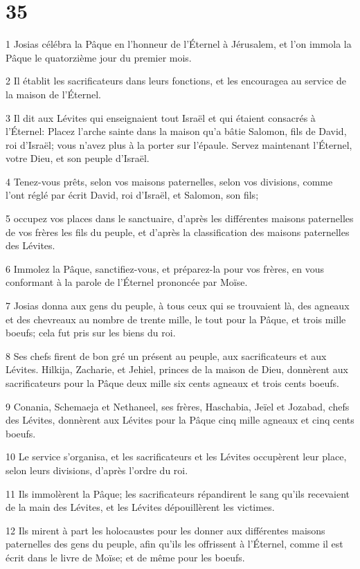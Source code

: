 \chapter{35}

\par 1 Josias célébra la Pâque en l'honneur de l'Éternel à Jérusalem, et l'on immola la Pâque le quatorzième jour du premier mois.
\par 2 Il établit les sacrificateurs dans leurs fonctions, et les encouragea au service de la maison de l'Éternel.
\par 3 Il dit aux Lévites qui enseignaient tout Israël et qui étaient consacrés à l'Éternel: Placez l'arche sainte dans la maison qu'a bâtie Salomon, fils de David, roi d'Israël; vous n'avez plus à la porter sur l'épaule. Servez maintenant l'Éternel, votre Dieu, et son peuple d'Israël.
\par 4 Tenez-vous prêts, selon vos maisons paternelles, selon vos divisions, comme l'ont réglé par écrit David, roi d'Israël, et Salomon, son fils;
\par 5 occupez vos places dans le sanctuaire, d'après les différentes maisons paternelles de vos frères les fils du peuple, et d'après la classification des maisons paternelles des Lévites.
\par 6 Immolez la Pâque, sanctifiez-vous, et préparez-la pour vos frères, en vous conformant à la parole de l'Éternel prononcée par Moïse.
\par 7 Josias donna aux gens du peuple, à tous ceux qui se trouvaient là, des agneaux et des chevreaux au nombre de trente mille, le tout pour la Pâque, et trois mille boeufs; cela fut pris sur les biens du roi.
\par 8 Ses chefs firent de bon gré un présent au peuple, aux sacrificateurs et aux Lévites. Hilkija, Zacharie, et Jehiel, princes de la maison de Dieu, donnèrent aux sacrificateurs pour la Pâque deux mille six cents agneaux et trois cents boeufs.
\par 9 Conania, Schemaeja et Nethaneel, ses frères, Haschabia, Jeïel et Jozabad, chefs des Lévites, donnèrent aux Lévites pour la Pâque cinq mille agneaux et cinq cents boeufs.
\par 10 Le service s'organisa, et les sacrificateurs et les Lévites occupèrent leur place, selon leurs divisions, d'après l'ordre du roi.
\par 11 Ils immolèrent la Pâque; les sacrificateurs répandirent le sang qu'ils recevaient de la main des Lévites, et les Lévites dépouillèrent les victimes.
\par 12 Ils mirent à part les holocaustes pour les donner aux différentes maisons paternelles des gens du peuple, afin qu'ils les offrissent à l'Éternel, comme il est écrit dans le livre de Moïse; et de même pour les boeufs.
